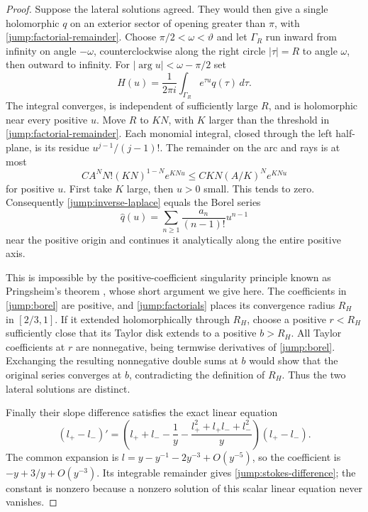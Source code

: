 \begin{proof}
Suppose the lateral solutions agreed.  They would then give a
single holomorphic $q$ on an exterior sector of opening greater
than $\pi$, with \eqref{jump:factorial-remainder}.  Choose
$\pi/2<\omega<\vartheta$ and let $\Gamma_R$ run inward from
infinity on angle $-\omega$, counterclockwise along the right
circle $|\tau|=R$ to angle $\omega$, then outward to infinity.
For $|\arg u|<\omega-\pi/2$ set
\begin{equation}\label{jump:inverse-laplace}
 H(u)=\frac1{2\pi i}\int_{\Gamma_R} e^{\tau u}q(\tau)\,d\tau.
\end{equation}
The integral converges, is independent of sufficiently large $R$,
and is holomorphic near every positive $u$.  Move $R$ to $KN$,
with $K$ larger than the threshold in
\eqref{jump:factorial-remainder}.  Each monomial integral, closed
through the left half-plane, is its residue
$u^{j-1}/(j-1)!$.  The remainder on the arc and rays is at most
\[
 C A^N N!(KN)^{1-N}e^{KNu}
       \leq CKN(A/K)^Ne^{KNu}
\]
for positive $u$.  First take $K$ large, then $u>0$ small.
This tends to zero.  Consequently \eqref{jump:inverse-laplace}
equals the Borel series
\begin{equation}\label{jump:borel}
 \widehat q(u)=\sum_{n\geq1}
                         \frac{a_n}{(n-1)!}u^{n-1}
\end{equation}
near the positive origin and continues it analytically along the
entire positive axis.

This is impossible by the positive-coefficient singularity principle
known as Pringsheim's theorem
\cite[Theorem~IV.6 and Note~IV.13]{FS2009}, whose short argument
we give here.
The coefficients in \eqref{jump:borel}
are positive, and \eqref{jump:factorials} places its convergence
radius $R_H$ in $[2/3,1]$.  If it extended holomorphically through
$R_H$, choose a positive $r<R_H$ sufficiently close that its
Taylor disk extends to a positive $b>R_H$.  All Taylor
coefficients at $r$ are nonnegative, being termwise derivatives
of \eqref{jump:borel}.  Exchanging the resulting nonnegative
double sums at $b$ would show that the original series converges
at $b$, contradicting the definition of $R_H$.  Thus the two
lateral solutions are distinct.

Finally their slope difference satisfies the exact linear equation
\begin{equation}\label{jump:slope-difference-equation}
 (l_+-l_-)'=
 \left(l_++l_--\frac1y-
       \frac{l_+^2+l_+l_-+l_-^2}{y}\right)(l_+-l_-).
\end{equation}
The common expansion is
$l=y-y^{-1}-2y^{-3}+O(y^{-5})$, so the coefficient is
$-y+3/y+O(y^{-3})$.  Its integrable remainder gives
\eqref{jump:stokes-difference}; the constant is nonzero because
a nonzero solution of this scalar linear equation never vanishes.


\end{proof}
